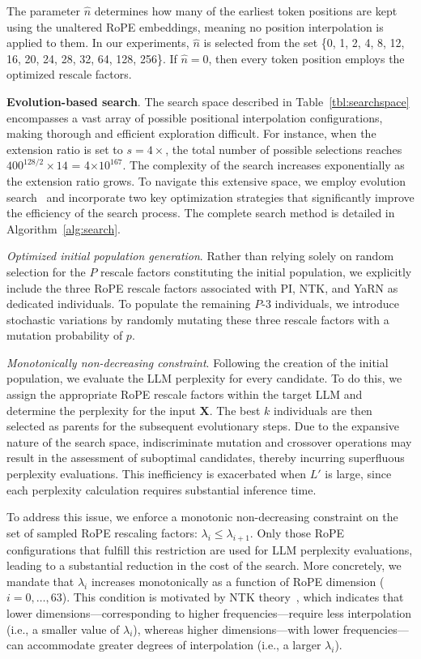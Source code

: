 The parameter $\hat{n}$ determines how many of the earliest token positions are kept using the unaltered RoPE embeddings, meaning no position interpolation is applied to them. In our experiments, $\hat{n}$ is selected from the set \{0, 1, 2, 4, 8, 12, 16, 20, 24, 28, 32, 64, 128, 256\}. If $\hat{n}=0$, then every token position employs the optimized rescale factors.

\textbf{Evolution-based search}. The search space described in Table~\ref{tbl:searchspace} encompasses a vast array of possible positional interpolation configurations, making thorough and efficient exploration difficult. For instance, when the extension ratio is set to $s=4\times$, the total number of possible selections reaches $400^{128/2}\times14$ = 4$\times10^{167}$. The complexity of the search increases exponentially as the extension ratio grows. To navigate this extensive space, we employ evolution search~\cite{guo2020single} and incorporate two key optimization strategies that significantly improve the efficiency of the search process. The complete search method is detailed in Algorithm~\ref{alg:search}.

\textit{Optimized initial population generation}. Rather than relying solely on random selection for the $P$ rescale factors constituting the initial population, we explicitly include the three RoPE rescale factors associated with PI, NTK, and YaRN as dedicated individuals. To populate the remaining $P$-3 individuals, we introduce stochastic variations by randomly mutating these three rescale factors with a mutation probability of $p$.

\textit{Monotonically non-decreasing constraint}. Following the creation of the initial population, we evaluate the LLM perplexity for every candidate. To do this, we assign the appropriate RoPE rescale factors within the target LLM and determine the perplexity for the input $\mathbf{X}$. The best $k$ individuals are then selected as parents for the subsequent evolutionary steps. Due to the expansive nature of the search space, indiscriminate mutation and crossover operations may result in the assessment of suboptimal candidates, thereby incurring superfluous perplexity evaluations. This inefficiency is exacerbated when $L'$ is large, since each perplexity calculation requires substantial inference time.

To address this issue, we enforce a monotonic non-decreasing constraint on the set of sampled RoPE rescaling factors: $\lambda_i\le \lambda_{i+1}$. Only those RoPE configurations that fulfill this restriction are used for LLM perplexity evaluations, leading to a substantial reduction in the cost of the search. More concretely, we mandate that $\lambda_i$ increases monotonically as a function of RoPE dimension ($i = 0, \ldots, 63$). This condition is motivated by NTK theory~\cite{jacot2018neural,tancik2020fourier,ntk}, which indicates that lower dimensions—corresponding to higher frequencies—require less interpolation (i.e., a smaller value of $\lambda_i$), whereas higher dimensions—with lower frequencies—can accommodate greater degrees of interpolation (i.e., a larger $\lambda_i$).

